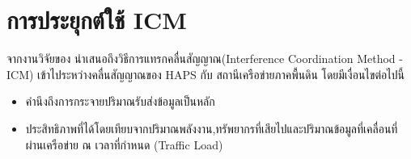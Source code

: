 \section{การประยุกต์ใช้ ICM}
จากงานวิจัยของ \cite[Interference Coordination Method for Integrated HAPS-Terrestrial Networks]{liu2021interference}
นำเสนอถึงวิธีการแทรกคลื่นสัญญาณ(Interference Coordination Method - ICM) เข้าไประหว่างคลื่นสัญญาณของ HAPS กับ สถานีเครือข่ายภาคพื้นดิน โดยมีเงื่อนไขต่อไปนี้
\begin{itemize}
    \item คำนึงถึงการกระจายปริมาณรับส่งข้อมูลเป็นหลัก 
    \item ประสิทธิภาพที่ได้โดยเทียบจากปริมาณพลังงาน,ทรัพยากรที่เสียไปและปริมาณข้อมูลที่เคลื่อนที่ผ่านเครือข่าย ณ เวลาที่กำหนด (Traffic Load)
\end{itemize}